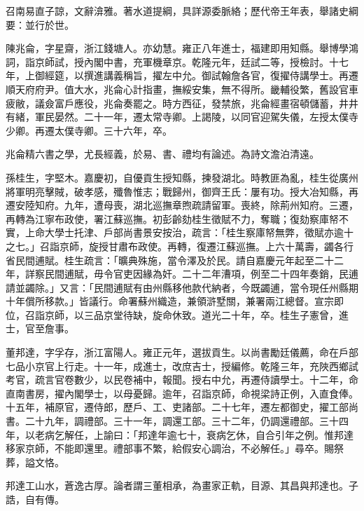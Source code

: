 \begin{pinyinscope}
召南易直子諒，文辭渰雅。著水道提綱，具詳源委脈絡；歷代帝王年表，舉諸史綱要：並行於世。

陳兆侖，字星齋，浙江錢塘人。亦幼慧。雍正八年進士，福建即用知縣。舉博學鴻詞，詣京師試，授內閣中書，充軍機章京。乾隆元年，廷試二等，授檢討。十七年，上御經筵，以撰進講義稱旨，擢左中允。御試翰詹各官，復擢侍講學士。再遷順天府府尹。值大水，兆侖心計指畫，撫綏安集，無不得所。畿輔役繁，舊設官車疲敝，議僉富戶應役，兆侖奏罷之。時方西征，發禁旅，兆侖經畫宿頓儲蓄，井井有緒，軍民晏然。二十一年，遷太常寺卿。上謁陵，以同官迎駕失儀，左授太僕寺少卿。再遷太僕寺卿。三十六年，卒。

兆侖精六書之學，尤長經義，於易、書、禮均有論述。為詩文澹泊清遠。

孫桂生，字堅木。嘉慶初，自優貢生授知縣，揀發湖北。時教匪為亂，桂生從廣州將軍明亮擊賊，破孝感，殲魯惟志；戰歸州，御齊王氏：屢有功。授大冶知縣，再遷安陸知府。九年，遭母喪，湖北巡撫章煦疏請留軍。喪終，除荊州知府。三遷，再轉為江寧布政使，署江蘇巡撫。初彭齡劾桂生徵賦不力，奪職；復劾察庫帑不實，上命大學士托津、戶部尚書景安按治，疏言：「桂生察庫帑無弊，徵賦亦逾十之七。」召詣京師，旋授甘肅布政使。再轉，復遷江蘇巡撫。上六十萬壽，蠲各行省民間逋賦。桂生疏言：「曠典殊施，當令澤及於民。請自嘉慶元年起至二十二年，詳察民間逋賦，毋令官吏因緣為奸。二十二年漕項，例至二十四年奏銷，民逋請並蠲除。」又言：「民間逋賦有由州縣移他款代納者，今既蠲逋，當令現任州縣期十年償所移款。」皆議行。命署蘇州織造，兼領滸墅關，兼署兩江總督。宣宗即位，召詣京師，以三品京堂待缺，旋命休致。道光二十年，卒。桂生子憲曾，進士，官至詹事。

董邦達，字孚存，浙江富陽人。雍正元年，選拔貢生。以尚書勵廷儀薦，命在戶部七品小京官上行走。十一年，成進士，改庶吉士，授編修。乾隆三年，充陜西鄉試考官，疏言官卷數少，以民卷補中，報聞。授右中允，再遷侍讀學士。十二年，命直南書房，擢內閣學士，以母憂歸。逾年，召詣京師，命視梁詩正例，入直食俸。十五年，補原官，遷侍郎，歷戶、工、吏諸部。二十七年，遷左都御史，擢工部尚書。二十九年，調禮部。三十一年，調還工部。三十二年，仍調還禮部。三十四年，以老病乞解任，上諭曰：「邦達年逾七十，衰病乞休，自合引年之例。惟邦達移家京師，不能即還里。禮部事不繁，給假安心調治，不必解任。」尋卒。賜祭葬，謚文恪。

邦達工山水，蒼逸古厚。論者謂三董相承，為畫家正軌，目源、其昌與邦達也。子誥，自有傳。


\end{pinyinscope}
